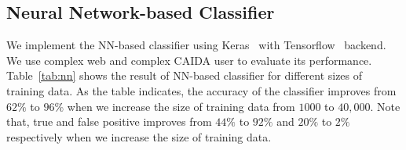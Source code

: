 \subsection{Neural Network-based Classifier}

We implement the NN-based classifier using Keras~\cite{keras} with Tensorflow~\cite{tensorflow2015-whitepaper} backend. We use complex web and complex CAIDA user to evaluate its performance. Table~\ref{tab:nn} shows the result of NN-based classifier for different sizes of training data. As the table indicates, the accuracy of the classifier improves from $62\%$ to $96\%$ when we increase the size of training data from $1000$ to $40,000$. Note that, true and false positive improves from $44\%$ to $92\%$ and $20\%$ to $2\%$ respectively when we increase the size of training data.

